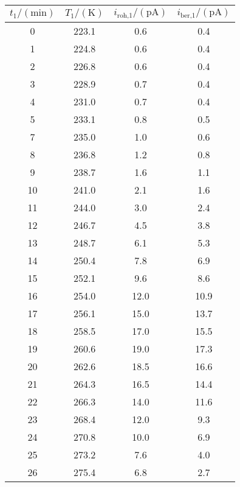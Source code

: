 \label{tab:tabData1_1}
	\begin{tabular}{S[table-format=2.0]S[table-format=3.1]S[table-format=2.1]S[table-format=2.1]}
		\toprule
		{$t_\text{1}/(\si{\minute})$} & {$T_\text{1}/(\si{\kelvin})$} & {$i_\text{roh,1}/(\si{\pico\ampere})$} & {$i_\text{ber,1}/(\si{\pico\ampere})$} \\
		 & 223.1 & 0.6 & 0.4 \\
		 1 & 224.8 & 0.6 & 0.4 \\
		 2 & 226.8 & 0.6 & 0.4 \\
		 3 & 228.9 & 0.7 & 0.4 \\
		 4 & 231.0 & 0.7 & 0.4 \\
		 5 & 233.1 & 0.8 & 0.5 \\
		 7 & 235.0 & 1.0 & 0.6 \\
		 8 & 236.8 & 1.2 & 0.8 \\
		 9 & 238.7 & 1.6 & 1.1 \\
		10 & 241.0 & 2.1 & 1.6 \\
		11 & 244.0 & 3.0 & 2.4 \\
		12 & 246.7 & 4.5 & 3.8 \\
		13 & 248.7 & 6.1 & 5.3 \\
		14 & 250.4 & 7.8 & 6.9 \\
		15 & 252.1 & 9.6 & 8.6 \\
		16 & 254.0 & 12.0 & 10.9 \\
		17 & 256.1 & 15.0 & 13.7 \\
		18 & 258.5 & 17.0 & 15.5 \\
		19 & 260.6 & 19.0 & 17.3 \\
		20 & 262.6 & 18.5 & 16.6 \\
		21 & 264.3 & 16.5 & 14.4 \\
		22 & 266.3 & 14.0 & 11.6 \\
		23 & 268.4 & 12.0 & 9.3 \\
		24 & 270.8 & 10.0 & 6.9 \\
		25 & 273.2 & 7.6 & 4.0 \\
		26 & 275.4 & 6.8 & 2.7 \\
		\bottomrule
	\end{tabular}
